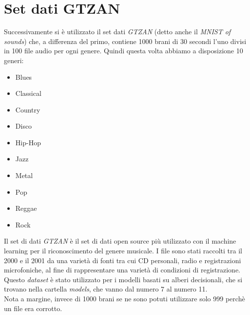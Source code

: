 \section{Set dati GTZAN}
Successivamente si è utilizzato il set dati \textit{GTZAN} (detto anche il \textit{MNIST of sounds}) che, a differenza del primo, contiene 1000 brani di 30 secondi l'uno divisi in 100 file audio per ogni genere. Quindi questa volta abbiamo a disposizione 10 generi:
\begin{itemize}
	\item Blues
	\item Classical
	\item Country
	\item Disco
	\item Hip-Hop
	\item Jazz
	\item Metal
	\item Pop
	\item Reggae
	\item Rock
\end{itemize}
Il set di dati \textit{GTZAN} è il set di dati open source più utilizzato con il machine learning per il riconoscimento del genere musicale. I file sono stati raccolti tra il 2000 e il 2001 da una varietà di fonti tra cui CD personali, radio e registrazioni microfoniche, al fine di rappresentare una varietà di condizioni di registrazione.\\
Questo \textit{dataset} è stato utilizzato per i modelli basati su alberi decisionali, che si trovano nella cartella \textit{models}, che vanno dal numero 7 al numero 11.\\
Nota a margine, invece di 1000 brani se ne sono potuti utilizzare solo 999 perchè un file era corrotto.